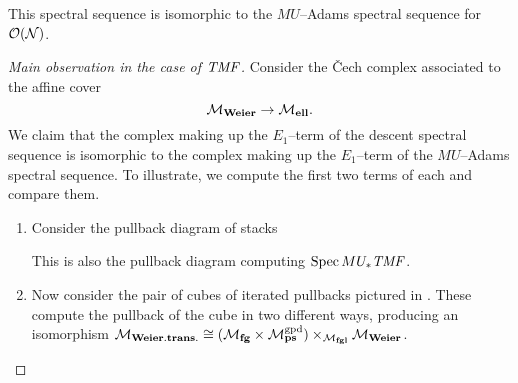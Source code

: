 \begin{lemma}
This spectral sequence is isomorphic to the \(MU\)--Adams spectral sequence for \(\mathcal{O}(\mathcal{N})\).
\end{lemma}
\begin{proof}[{Main observation in the case of \(\mathit{TMF}\)}]
Consider the \v{C}ech complex associated to the affine cover \[\mathcal{M}_{\mathbf{Weier}} \to \mathcal{M}_{\mathbf{ell}}.\]  We claim that the complex making up the \(E_1\)--term of the descent spectral sequence is isomorphic to the complex making up the \(E_1\)--term of the \(MU\)--Adams spectral sequence.  To illustrate, we compute the first two terms of each and compare them.
\begin{enumerate}
    \item Consider the pullback diagram of stacks
    \begin{center}
    \end{center}
    This is also the pullback diagram computing \(\operatorname{Spec} MU_* \mathit{TMF}\).
    \item Now consider the pair of cubes of iterated pullbacks pictured in .  These compute the pullback of the cube in two different ways, producing an isomorphism \(\mathcal{M}_{\mathbf{Weier.trans.}} \cong (\mathcal{M}_{\mathbf{fg}} \times \mathcal{M}_{\mathbf{ps}}^{\mathrm{gpd}}) \times_{\mathcal{M}_{\mathbf{fgl}}} \mathcal{M}_{\mathbf{Weier}}\).
\begin{figure}
    \begin{center}
     \hspace{1em}

\end{center}
\end{figure}
\end{enumerate}
\end{proof}
